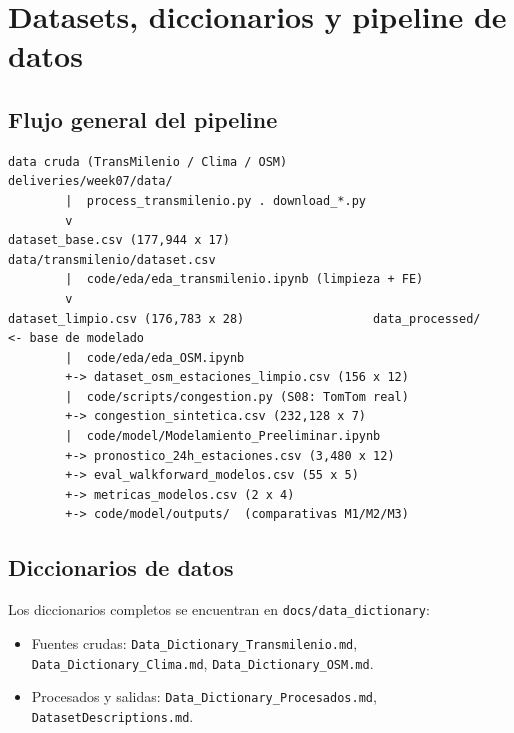 \documentclass[11pt]{article}
\begin{document}
\section{Datasets, diccionarios y pipeline de datos}
\label{sec:datasets}
\subsection{Flujo general del pipeline}
\begin{verbatim}
data cruda (TransMilenio / Clima / OSM)            deliveries/week07/data/
        |  process_transmilenio.py . download_*.py
        v
dataset_base.csv (177,944 x 17)                    data/transmilenio/dataset.csv
        |  code/eda/eda_transmilenio.ipynb (limpieza + FE)
        v
dataset_limpio.csv (176,783 x 28)                  data_processed/   <- base de modelado
        |  code/eda/eda_OSM.ipynb
        +-> dataset_osm_estaciones_limpio.csv (156 x 12)
        |  code/scripts/congestion.py (S08: TomTom real)
        +-> congestion_sintetica.csv (232,128 x 7)
        |  code/model/Modelamiento_Preeliminar.ipynb
        +-> pronostico_24h_estaciones.csv (3,480 x 12)
        +-> eval_walkforward_modelos.csv (55 x 5)
        +-> metricas_modelos.csv (2 x 4)
        +-> code/model/outputs/  (comparativas M1/M2/M3)
\end{verbatim}

\subsection{Diccionarios de datos}
Los diccionarios completos se encuentran en \texttt{docs/data\_dictionary}:
\begin{itemize}
  \item Fuentes crudas: \texttt{Data\_Dictionary\_Transmilenio.md}, \texttt{Data\_Dictionary\_Clima.md},
        \texttt{Data\_Dictionary\_OSM.md}.
  \item Procesados y salidas: \texttt{Data\_Dictionary\_Procesados.md},
        \texttt{DatasetDescriptions.md}.
\end{itemize}
\end{document}
